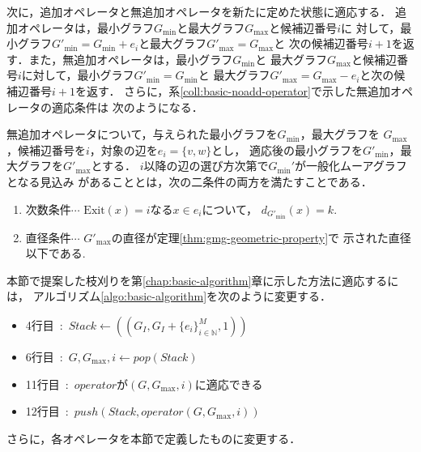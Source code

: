 次に，追加オペレータと無追加オペレータを新たに定めた状態に適応する．
追加オペレータは，最小グラフ$G_{\min}$と最大グラフ$G_{\max}$と候補辺番号$i$に
対して，最小グラフ$G'_{\min}=G_{\min}+e_i$と最大グラフ$G'_{\max}=G_{\max}$と
次の候補辺番号$i+1$を返す．また，無追加オペレータは，最小グラフ$G_{\min}$と
最大グラフ$G_{\max}$と候補辺番号$i$に対して，最小グラフ$G'_{\min}=G_{\min}$と
最大グラフ$G'_{\max}=G_{\max}-e_i$と次の候補辺番号$i+1$を返す．
さらに，系\ref{coll:basic-noadd-operator}で示した無追加オペレータの適応条件は
次のようになる．
\begin{corollary-without-proof}
  \label{coll:minmax-noadd-operator}
  \rm
  無追加オペレータについて，与えられた最小グラフを$G_{\min}$，最大グラフを
  $G_{\max}$，候補辺番号を$i$，対象の辺を$e_i=\{v,w\}$とし，
  適応後の最小グラフを$G'_{\min}$，最大グラフを$G'_{\max}$とする．
  $i$以降の辺の選び方次第で$G_{\min}'$が一般化ムーアグラフとなる見込み
  があることとは，次の二条件の両方を満たすことである．
  \begin{enumerate}
  \item 次数条件$\cdots$ $\text{Exit}(x)=i$なる$x\in e_i$について，
    $d_{G'_{\min}}(x)=k$.
  \item 直径条件$\cdots$ $G'_{\max}$の直径が定理\ref{thm:gmg-geometric-property}で
    示された直径以下である.
  \end{enumerate}
\end{corollary-without-proof}

本節で提案した枝刈りを第\ref{chap:basic-algorithm}章に示した方法に適応するには，
アルゴリズム\ref{algo:basic-algorithm}を次のように変更する．
\begin{itemize}
\item 4行目\ :\ $Stack\gets((G_I,G_I+\{e_i\}^M_{i\in\mathbb{N}},1))$
\item 6行目\ :\ $G,G_{\max},i\gets pop(Stack)$
\item 11行目\ :\ $operator$が$(G,G_{\max},i)$に適応できる
\item 12行目\ :\ $push(Stack,operator(G,G_{\max},i))$
\end{itemize}
さらに，各オペレータを本節で定義したものに変更する．

